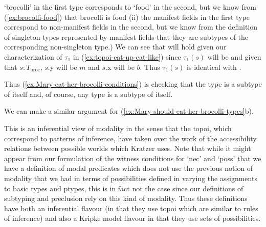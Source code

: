 `brocolli' in the first type corresponds to `food' in the second, but
we know from (\ref{ex:brocolli-food}) that brocolli is food (ii) the
manifest fields in the first type correspond to non-manifest fields in
the second, but we know from the definition of singleton types
represented by manifest fields that
they are subtypes of the corresponding non-singleton type.)
We can see that  will hold given our characterization of
$\tau_1$ in (\ref{ex:topoi-eat-up-eat-like}) since $\tau_1(s)$ will be
 and given that $s:T_{\mathrm{broc}}$, $s$.y will be $m$ and
$s$.x will be $b$.  Thus $\tau_1(s)$ is identical with .
\begin{ex} 
\begin{subex} 
 
\item {} 
 
\item {} 
 
\end{subex} 
   
\end{ex} 
Thus (\ref{ex:Mary-eat-her-brocolli-conditions}) is checking that the
type  is a subtype of
itself and, of course, any type is a subtype of itself. 

We can make a similar argument for (\ref{ex:Mary-should-eat-her-brocolli-types}b).

    
   

This is an inferential view of modality in the sense that the topoi,
which correspond to patterns of inference, have taken over the work of
the accessibility relations between possible worlds which Kratzer
uses.  
Note that while it might appear from our formulation of the witness
conditions for `nec' and `poss' that we have a
definition of modal predicates which does not use the previous notion
of modality that we had in terms of possibilities defined in varying
the assignments to basic types and ptypes, this is in fact not the
case since our definitions of subtyping and preclusion rely on this
kind of modality.  Thus these definitions have both an inferential
flavour (in that they use topoi which are similar to rules of
inference) and also a Kripke model flavour in that they use sets of
possibilities. 


